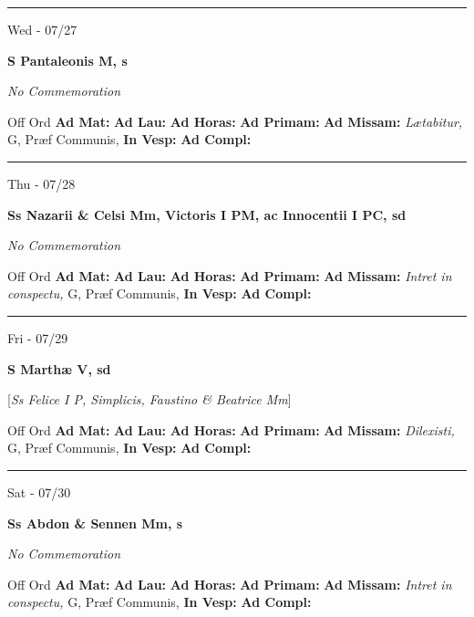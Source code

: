 \documentclass[letterpaper, 10pt]{article}
\begin{document}
\hrule
\begin{center}
Wed - 07/27
\end{center}\textbf{ \large S Pantaleonis M, \textnormal{\normalsize s}}

\textit{No Commemoration}\begin{justify}
Off Ord
\textbf{Ad Mat: }
\textbf{Ad Lau: }
\textbf{Ad Horas: }
\textbf{Ad Primam: }
\textbf{Ad Missam:} \textit{Lætabitur, } G, Præf Communis, 
\textbf{In Vesp: }
\textbf{Ad Compl: }\end{justify}



\hrule
\begin{center}
Thu - 07/28
\end{center}\textbf{ \large Ss Nazarii \& Celsi Mm, Victoris I PM, ac Innocentii I PC, \textnormal{\normalsize sd}}

\textit{No Commemoration}\begin{justify}
Off Ord
\textbf{Ad Mat: }
\textbf{Ad Lau: }
\textbf{Ad Horas: }
\textbf{Ad Primam: }
\textbf{Ad Missam:} \textit{Intret in conspectu, } G, Præf Communis, 
\textbf{In Vesp: }
\textbf{Ad Compl: }\end{justify}



\hrule
\begin{center}
Fri - 07/29
\end{center}\textbf{ \large S Marthæ V, \textnormal{\normalsize sd}}

[\textit{Ss Felice I P, Simplicis, Faustino \& Beatrice Mm}]
\begin{justify}
Off Ord
\textbf{Ad Mat: }
\textbf{Ad Lau: }
\textbf{Ad Horas: }
\textbf{Ad Primam: }
\textbf{Ad Missam:} \textit{Dilexisti, } G, Præf Communis, 
\textbf{In Vesp: }
\textbf{Ad Compl: }\end{justify}



\hrule
\begin{center}
Sat - 07/30
\end{center}\textbf{ \large Ss Abdon \& Sennen Mm, \textnormal{\normalsize s}}

\textit{No Commemoration}\begin{justify}
Off Ord
\textbf{Ad Mat: }
\textbf{Ad Lau: }
\textbf{Ad Horas: }
\textbf{Ad Primam: }
\textbf{Ad Missam:} \textit{Intret in conspectu, } G, Præf Communis, 
\textbf{In Vesp: }
\textbf{Ad Compl: }\end{justify}
\end{document}
